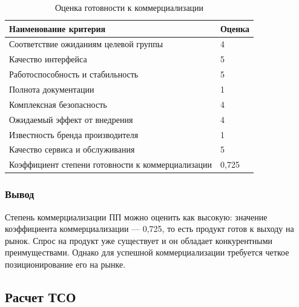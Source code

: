 \begin{table}[htb]
	\caption{Оценка готовности к коммерциализации}
	\centering
	
	\emergencystretch=10pt
	\begin{tabular}{@{}ll@{}}
		\toprule
		\textbf{Наименование критерия}                       & \textbf{Оценка} \\ \midrule
		Соответствие ожиданиям целевой группы           & 4              \\
		Качество интерфейса                            & 5              \\
		Работоспособность и стабильность               & 5              \\
		Полнота документации                           & 1              \\
		Комплексная безопасность                       & 4              \\
		Ожидаемый эффект от внедрения                  & 4              \\
		Известность бренда производителя               & 1              \\
		Качество сервиса и обслуживания                & 5              \\ \midrule
		Коэффициент степени готовности к коммерциализации & 0,725        \\ \bottomrule
	\end{tabular}
	\label{tab:prepare_mark}
\end{table}

\subsubsection*{Вывод}

Степень коммерциализации ПП можно оценить как высокую: значение коэффициента коммерциализации --- 0,725, то есть продукт готов к выходу на рынок. Спрос на продукт уже существует и он обладает конкурентными преимуществами. Однако для успешной коммерциализации требуется четкое позиционирование его на рынке.


\subsection{Расчет ТСО}


